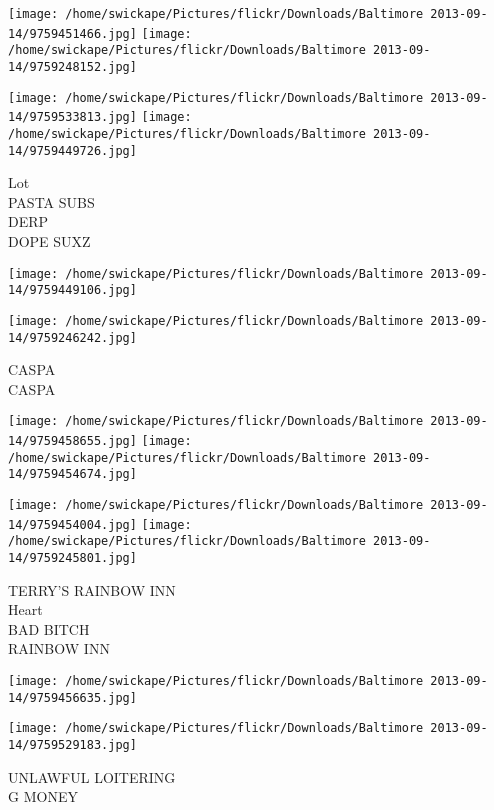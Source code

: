 \documentclass[10pt,letterpaper]{article}
\begin{document}
\texttt{[image: /home/swickape/Pictures/flickr/Downloads/Baltimore 2013-09-14/9759451466.jpg]}
\texttt{[image: /home/swickape/Pictures/flickr/Downloads/Baltimore 2013-09-14/9759248152.jpg]}

\texttt{[image: /home/swickape/Pictures/flickr/Downloads/Baltimore 2013-09-14/9759533813.jpg]}
\texttt{[image: /home/swickape/Pictures/flickr/Downloads/Baltimore 2013-09-14/9759449726.jpg]}

Lot\\
PASTA SUBS\\
DERP\\
DOPE SUXZ\\
\pagebreak

\texttt{[image: /home/swickape/Pictures/flickr/Downloads/Baltimore 2013-09-14/9759449106.jpg]}

\vspace{0.25in}
\texttt{[image: /home/swickape/Pictures/flickr/Downloads/Baltimore 2013-09-14/9759246242.jpg]}

CASPA\\
CASPA\\
\pagebreak

\texttt{[image: /home/swickape/Pictures/flickr/Downloads/Baltimore 2013-09-14/9759458655.jpg]}
\texttt{[image: /home/swickape/Pictures/flickr/Downloads/Baltimore 2013-09-14/9759454674.jpg]}

\texttt{[image: /home/swickape/Pictures/flickr/Downloads/Baltimore 2013-09-14/9759454004.jpg]}
\texttt{[image: /home/swickape/Pictures/flickr/Downloads/Baltimore 2013-09-14/9759245801.jpg]}

TERRY'S RAINBOW INN\\
Heart\\
BAD BITCH\\
RAINBOW INN\\
\pagebreak

\texttt{[image: /home/swickape/Pictures/flickr/Downloads/Baltimore 2013-09-14/9759456635.jpg]}

\vspace{0.25in}
\texttt{[image: /home/swickape/Pictures/flickr/Downloads/Baltimore 2013-09-14/9759529183.jpg]}

UNLAWFUL LOITERING\\
G MONEY\\
\pagebreak
\end{document}

